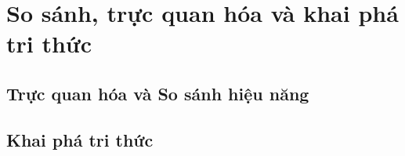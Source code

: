 \clearpage
\section{So sánh, trực quan hóa và khai phá tri thức}
\subsection{Trực quan hóa và So sánh hiệu năng}

\subsection{Khai phá tri thức}
